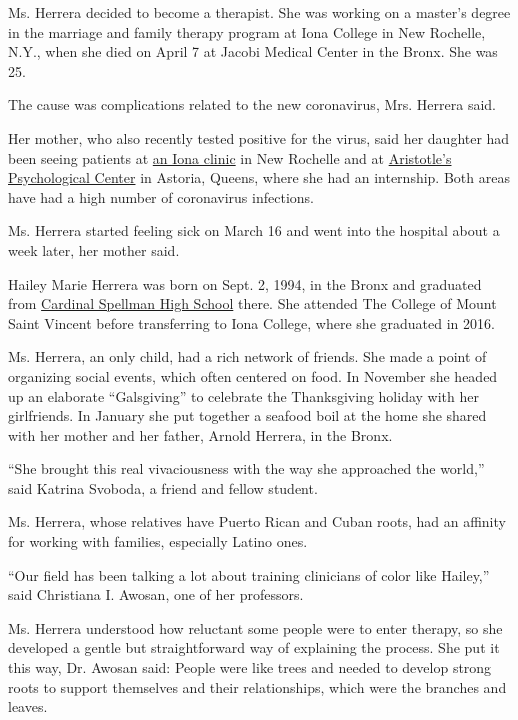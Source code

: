 Ms. Herrera decided to become a therapist. She was working on a master's
degree in the marriage and family therapy program at Iona College in New
Rochelle, N.Y., when she died on April 7 at Jacobi Medical Center in the
Bronx. She was 25.

The cause was complications related to the new coronavirus, Mrs. Herrera
said.

Her mother, who also recently tested positive for the virus, said her
daughter had been seeing patients at
\href{https://www.iona.edu/academics/school-of-arts-science/departments/speech-communication/speech-and-language-hearing-clinic/clinic-services.aspx}{an
Iona clinic} in New Rochelle and at
\href{http://www.aristotlespsychological.com/}{Aristotle's Psychological
Center} in Astoria, Queens, where she had an internship. Both areas have
had a high number of coronavirus infections.

Ms. Herrera started feeling sick on March 16 and went into the hospital
about a week later, her mother said.

Hailey Marie Herrera was born on Sept. 2, 1994, in the Bronx and
graduated from \href{https://www.cardinalspellman.org/\#}{Cardinal
Spellman High School} there. She attended The College of Mount Saint
Vincent before transferring to Iona College, where she graduated in
2016.

Ms. Herrera, an only child, had a rich network of friends. She made a
point of organizing social events, which often centered on food. In
November she headed up an elaborate ``Galsgiving'' to celebrate the
Thanksgiving holiday with her girlfriends. In January she put together a
seafood boil at the home she shared with her mother and her father,
Arnold Herrera, in the Bronx.

``She brought this real vivaciousness with the way she approached the
world,'' said Katrina Svoboda, a friend and fellow student.

Ms. Herrera, whose relatives have Puerto Rican and Cuban roots, had an
affinity for working with families, especially Latino ones.

``Our field has been talking a lot about training clinicians of color
like Hailey,'' said Christiana I. Awosan, one of her professors.

Ms. Herrera understood how reluctant some people were to enter therapy,
so she developed a gentle but straightforward way of explaining the
process. She put it this way, Dr. Awosan said: People were like trees
and needed to develop strong roots to support themselves and their
relationships, which were the branches and leaves.

